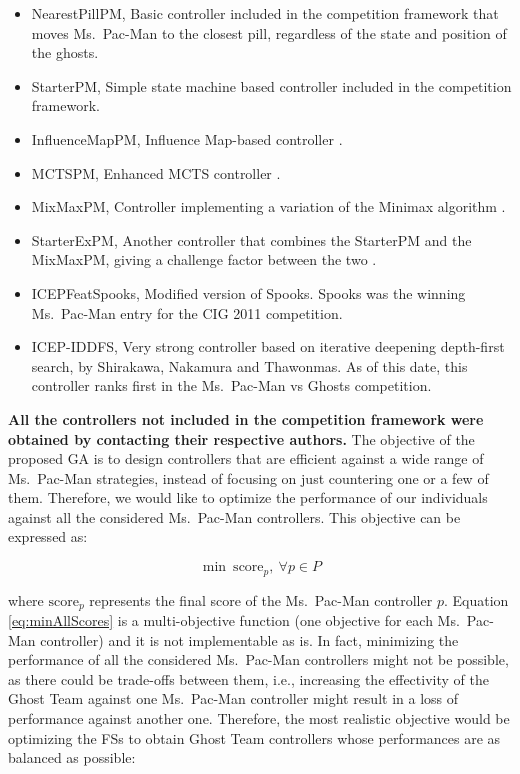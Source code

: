 \documentclass[journal]{IEEEtran}
\begin{document}
\begin{itemize}
  \item NearestPillPM, Basic controller included in the competition framework that moves Ms.\  Pac-Man to the closest pill, regardless of the state and position of the ghosts.
  \item StarterPM, Simple state machine based controller included in the competition framework.
  \item InfluenceMapPM, Influence Map-based controller \cite{Svensson2012}.
  \item MCTSPM, Enhanced MCTS controller \cite{Pepels2012}.
  \item MixMaxPM, Controller implementing a variation of the Minimax algorithm \cite{Cardona13}.
  \item StarterExPM, Another controller that combines the StarterPM and the MixMaxPM, giving a challenge factor between the two \cite{Cardona13}.
  \item ICEPFeatSpooks, Modified version of Spooks. Spooks was the winning Ms.\  Pac-Man entry for the CIG 2011 competition.
  \item ICEP-IDDFS, Very strong controller based on iterative deepening depth-first search, by Shirakawa, Nakamura and Thawonmas. As of this date, this controller ranks first in the Ms.\  Pac-Man vs Ghosts competition.
\end{itemize}

\textbf{All the controllers not included in the competition framework were obtained by contacting their respective authors.} The objective of the proposed GA is to design controllers that are efficient against a wide range of Ms.\  Pac-Man strategies, instead of focusing on just countering one or a few of them. Therefore, we would like to optimize the performance of our individuals against all the considered Ms.\  Pac-Man controllers. This objective can be expressed as:

\begin{equation}
\label{eq:minAllScores}
	\min \: \text{score}_p, \: \forall p \in P
\end{equation}

where $\text{score}_p$ represents the final score of the Ms.\  Pac-Man controller $p$. Equation \eqref{eq:minAllScores} is a multi-objective function (one objective for each Ms.\  Pac-Man controller) and it is not implementable as is. In fact, minimizing the performance of all the considered Ms.\  Pac-Man controllers might not be possible, as there could be trade-offs between them, i.e., increasing the effectivity of the Ghost Team against one Ms.\  Pac-Man controller might result in a loss of performance against another one. Therefore, the most realistic objective would be optimizing the FSs to obtain Ghost Team controllers whose performances are as balanced as possible:
\end{document}
